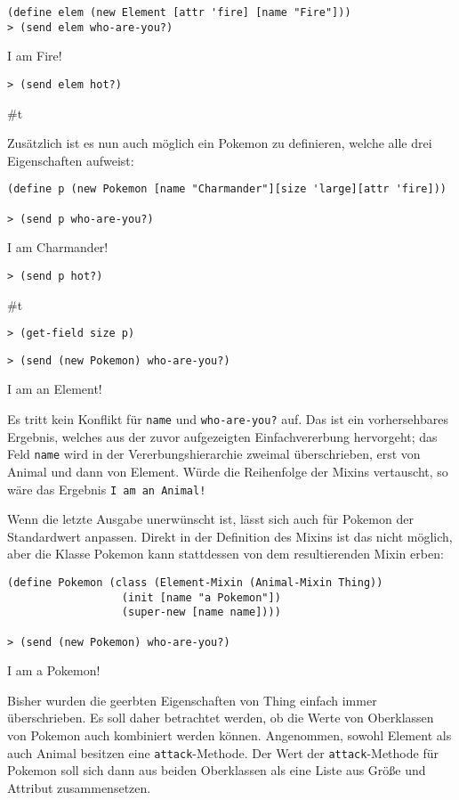 \begin{lstlisting}
(define elem (new Element [attr 'fire] [name "Fire"]))
> (send elem who-are-you?)
\end{lstlisting} 
{\routput {\qq}I am Fire!\qq}

\begin{lstlisting}
> (send elem hot?)
\end{lstlisting} 
{\routput \#t}

Zusätzlich ist es nun auch möglich ein Pokemon zu definieren, welche alle drei Eigenschaften aufweist:
\begin{lstlisting}
(define p (new Pokemon [name "Charmander"][size 'large][attr 'fire]))
 
> (send p who-are-you?)
\end{lstlisting}
{\routput {\qq}I am Charmander!\qq}
\begin{lstlisting}
> (send p hot?)
\end{lstlisting}
{\routput \#t}
\begin{lstlisting}
> (get-field size p)
\end{lstlisting}
{}
\begin{lstlisting}
> (send (new Pokemon) who-are-you?)
\end{lstlisting}
{\routput {\qq}I am an Element!\qq}

Es tritt kein Konflikt für \texttt{name} und \texttt{who-are-you?} auf. Das ist ein vorhersehbares Ergebnis, welches aus der zuvor aufgezeigten Einfachvererbung hervorgeht; das Feld \texttt{name} wird in der Vererbungshierarchie zweimal überschrieben, erst von Animal und dann von Element. Würde die Reihenfolge der Mixins vertauscht, so wäre das Ergebnis \texttt{{\qq}I am an Animal!\qq}

Wenn die letzte Ausgabe unerwünscht ist, lässt sich auch für Pokemon der Standardwert anpassen. Direkt in der Definition des Mixins ist das nicht möglich, aber die Klasse Pokemon kann stattdessen von dem resultierenden Mixin erben:

\begin{lstlisting}
(define Pokemon (class (Element-Mixin (Animal-Mixin Thing))
                  (init [name "a Pokemon"])
                  (super-new [name name])))
     
> (send (new Pokemon) who-are-you?)
\end{lstlisting}
{\routput {\qq}I am a Pokemon!\qq}

Bisher wurden die geerbten Eigenschaften von Thing einfach immer überschrieben. Es soll daher betrachtet werden, ob die Werte von Oberklassen von Pokemon auch kombiniert werden können. Angenommen, sowohl Element als auch Animal besitzen eine \texttt{attack}-Methode. Der Wert der \texttt{attack}-Methode für Pokemon soll sich dann aus beiden Oberklassen als eine Liste aus Größe und Attribut zusammensetzen.

